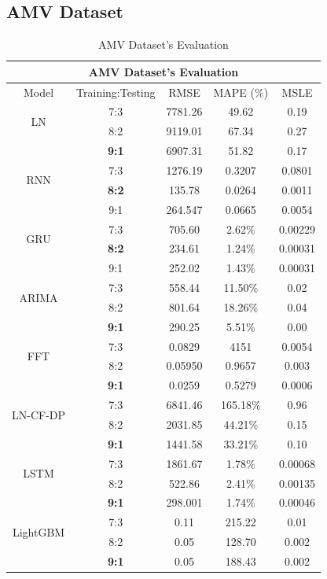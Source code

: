 \documentclass{ieeeojies}
\begin{document}
\subsection{AMV Dataset} 
\begin{table}[H]
    \centering
    \begin{tabular}{|c|c|c|c|c|}
         \hline
         \multicolumn{5}{|c|}{\textbf{AMV Dataset's Evaluation}}\\
         \hline
         \centering Model & Training:Testing & RMSE & MAPE (\%) & MSLE\\
         \hline
         \multirow{2}{*}{LN}& 7:3 & 7781.26 & 49.62 & 0.19\\ & 8:2 & 9119.01 & 67.34 & 0.27\\ & \textbf{9:1}& 6907.31& 51.82 & 0.17\\
         \hline
         \multirow{2}{*}{RNN} & 7:3&1276.19&0.3207&0.0801\\ & \textbf{8:2}&135.78&0.0264&0.0011\\ & 9:1  &264.547 &0.0665 &0.0054 \\
         \hline
         \multirow{2}{*}{GRU} & 7:3	& 705.60 & 2.62\% & 0.00229 \\ & \textbf{8:2} & 234.61 & 1.24\% & 0.00031 \\ & 9:1 & 252.02 & 1.43\% & 0.00031 \\
         \hline
         \multirow{2}{*}{ARIMA} & 7:3 & 558.44 & 11.50\% & 0.02 \\ & 8:2 & 801.64 & 18.26\% & 0.04 \\ & \textbf{9:1} & 290.25 & 5.51\% & 0.00\\
         \hline
         \multirow{2}{*}{FFT}& 7:3	& 0.0829& 4151& 0.0054\\ & 8:2 & 0.05950& 0.9657& 0.003\\ & \textbf{9:1} & 0.0259& 0.5279& 0.0006\\
         \hline
         \multirow{2}{*}{LN-CF-DP} & 7:3 & 6841.46 & 165.18\% & 0.96 \\ & 8:2 &2031.85	& 44.21\%&  0.15 \\ & \textbf{9:1} &1441.58&33.21\% & 0.10\\
         \hline
         \multirow{2}{*}{LSTM}& 7:3& 1861.67& 1.78\%& 0.00068\\ & 8:2 & 522.86& 2.41\%& 0.00135\\ & \textbf{9:1}& 298.001& 1.74\%& 0.00046\\
         \hline
         \multirow{2}{*}{LightGBM}& 7:3& 0.11& 215.22 & 0.01\\ & 8:2 & 0.05& 128.70 & 0.002\\ & \textbf{9:1}& 0.05& 188.43 & 0.002\\
         \hline
    \end{tabular}
    \caption{AMV Dataset's Evaluation}
    \label{vcbresult}
\end{table}
\end{document}
